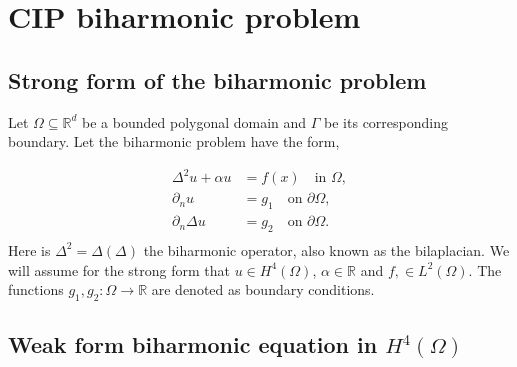 
\newpage
\section{CIP biharmonic problem }%
\label{sec:CIP_biharmonic_problem}




\subsection{Strong form of the biharmonic problem}%
\label{sub:strong_form_of_the_biharmonic_equation}

Let $\Omega \subseteq    \mathbb{R} ^d$ be a bounded polygonal domain and $\Gamma $ be its corresponding boundary. Let the biharmonic problem have the form,

\begin{equation}
\label{eq:bi_problem}
\begin{split}
    \Delta^2  u  + \alpha  u  & = f( x)  \quad \text{in } \Omega,   \\
    \partial _{n} u & = g_{1}  \quad \text{on } \partial \Omega,  \\
    \partial _{n} \Delta  u & = g_{2}  \quad \text{on } \partial \Omega .  \\
\end{split}
\end{equation}
Here is $\Delta ^2 = \Delta  \left( \Delta  \right) $ the biharmonic operator, also known as the bilaplacian. We will assume for the strong form that $u \in H^{4}\left( \Omega  \right) $, $\alpha  \in  \mathbb{R} $ and $f, \in L^{2}\left( \Omega  \right)
$. The functions $g_{1},g_{2}: \Omega  \to \mathbb{R}$ are denoted as boundary conditions.

\subsection{  Weak form biharmonic equation in $H^{4}\left( \Omega  \right) $}%
\label{sub:continious_weak_form_of_biharmonic_equation}

